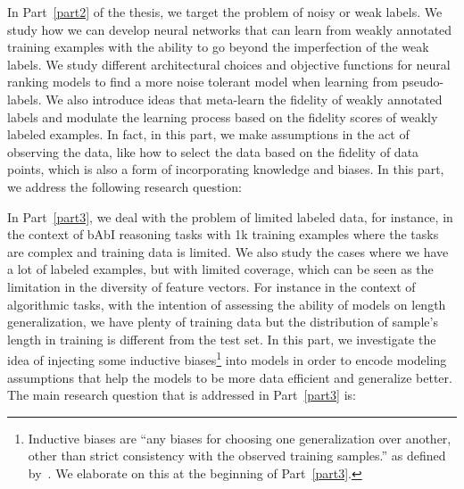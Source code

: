 In Part~\ref{part2} of the thesis, we target the problem of noisy or weak labels. We study how we can develop neural networks that can learn from weakly annotated training examples with the ability to go beyond the imperfection of the weak labels. We study different architectural choices and objective functions for neural ranking models to find a more noise tolerant model when learning from pseudo-labels.  We also introduce ideas that meta-learn the fidelity of weakly annotated labels and modulate the learning process based on the fidelity scores of weakly labeled examples. In fact, in this part, we make assumptions in the act of observing the data, like how to select the data based on the fidelity of data points, which is also a form of incorporating knowledge and biases.
In this part, we address the following research question:


In Part~\ref{part3}, we deal with the problem of limited labeled data, for instance, in the context of bAbI reasoning tasks with 1k training examples where the tasks are complex and training data is limited. We also study the cases where we have a lot of labeled examples, but with limited coverage, which can be seen as the limitation in the diversity of feature vectors. For instance in the context of algorithmic tasks, with the intention of assessing the ability of models on length generalization, we have plenty of training data but the distribution of sample's length in training is different from the test set. 
In this part, we investigate the idea of injecting some inductive biases\footnote{Inductive biases are ``any biases for choosing one generalization over another, other than strict consistency with the observed training samples.'' as defined by~\citet{Mitchell80theneed}. We elaborate on this at the beginning of Part~\ref{part3}.} into models in order to encode modeling assumptions that help the models to be more data efficient and generalize better.
The main research question that is addressed in Part~\ref{part3} is:


